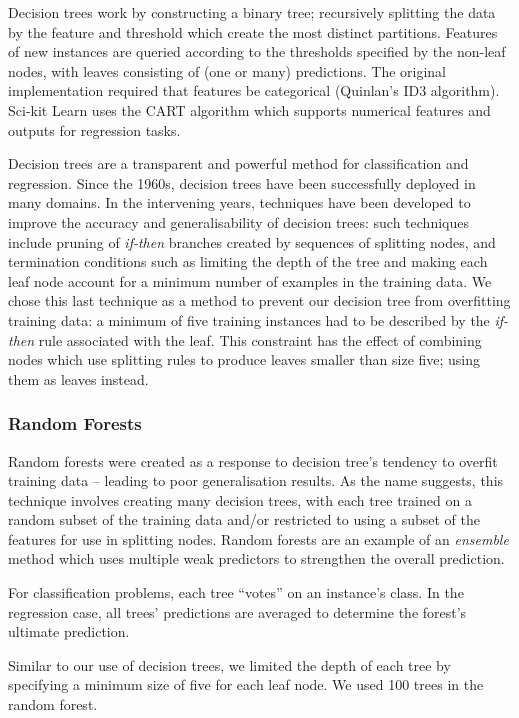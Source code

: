 Decision trees \cite{DecisionTrees} work by constructing a binary tree; recursively splitting the data by the feature and threshold which create the most distinct partitions.
Features of new instances are queried according to the thresholds specified by the non-leaf nodes, with leaves consisting of (one or many) predictions. 
The original implementation required that features be categorical (Quinlan's ID3 algorithm). 
Sci-kit Learn uses the CART \cite{cart} algorithm which supports numerical features and outputs for regression tasks.  

Decision trees are a transparent and powerful method for classification and regression.
Since the 1960s, decision trees have been successfully deployed in many domains. 
In the intervening years, techniques have been developed to improve the accuracy and generalisability of decision trees: such techniques include pruning of \textit{if-then} branches created by sequences of splitting nodes, and termination conditions such as limiting the depth of the tree and making each leaf node account for a minimum number of examples in the training data.
We chose this last technique as a method to prevent our decision tree from overfitting training data: a minimum of five training instances had to be described by the \textit{if-then} rule associated with the leaf.
This constraint has the effect of combining nodes which use splitting rules to produce leaves smaller than size five; using them as leaves instead. 

\subsubsection{Random Forests}

Random forests \cite{RandomForests} were created as a response to decision tree's tendency to overfit training data -- leading to poor generalisation results.
As the name suggests, this technique involves creating many decision trees, with each tree trained on a random subset of the training data and/or restricted to using a subset of the features for use in splitting nodes.
Random forests are an example of an \textit{ensemble} method which uses multiple weak predictors to strengthen the overall prediction.

For classification problems, each tree ``votes'' on an instance's class.
In the regression case, all trees' predictions are averaged to determine the forest's ultimate prediction.   

Similar to our use of decision trees, we limited the depth of each tree by specifying a minimum size of five for each leaf node. 
We used 100 trees in the random forest.

